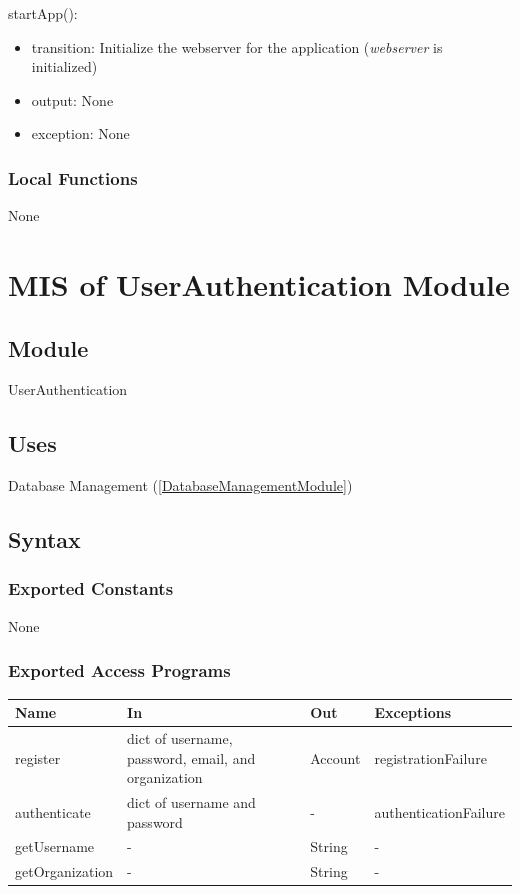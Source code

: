\documentclass[12pt, titlepage]{article}
\begin{document}
\noindent startApp():
\begin{itemize}
\item transition: Initialize the webserver for the application (\textit{webserver} is initialized)
\item output: None
\item exception: None
\end{itemize}

\subsubsection{Local Functions}

None

\newpage


\section{MIS of UserAuthentication Module} \label{AuthenticationModule}

\subsection{Module}

UserAuthentication

\subsection{Uses}

Database Management (\ref{DatabaseManagementModule})

\subsection{Syntax}

\subsubsection{Exported Constants}

None


\subsubsection{Exported Access Programs}

\begin{center}
\begin{tabular}{p{4cm} p{4cm} p{2cm} p{4cm}}
\hline
\textbf{Name} & \textbf{In} & \textbf{Out} & \textbf{Exceptions} \\
\hline
register & dict of username, password, email, and organization & Account & registrationFailure \\
\hline
authenticate & dict of username and password & - & authenticationFailure \\
\hline
getUsername & - & String & - \\
\hline
getOrganization & - & String & - \\
\hline
\end{tabular}
\end{center}
\end{document}
